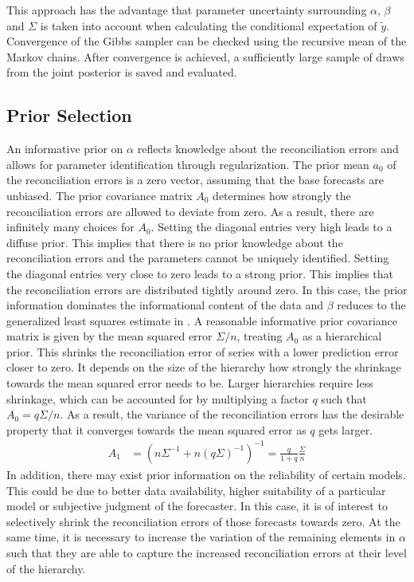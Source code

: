 \documentclass[a4paper,fleqn,11pt]{article}
\begin{document}
\noindent This approach has the advantage that parameter uncertainty surrounding $\alpha$, $\beta$ and $\Sigma$ is taken into account when calculating the conditional expectation of $\tilde y$. Convergence of the Gibbs sampler can be checked using the recursive mean of the Markov chains. After convergence is achieved, a sufficiently large sample of draws from the joint posterior is saved and evaluated.\\

\subsection{Prior Selection}
\label{subsec:prior}
An informative prior on $\alpha$ reflects knowledge about the reconciliation errors and allows for parameter identification through regularization. The prior mean $a_0$ of the reconciliation errors is a zero vector, assuming that the base forecasts are unbiased. The prior covariance matrix $A_0$ determines how strongly the reconciliation errors are allowed to deviate from zero. As a result, there are infinitely many choices for $A_0$. Setting the diagonal entries very high leads to a diffuse prior. This implies that there is no prior knowledge about the reconciliation errors and the parameters cannot be uniquely identified. Setting the diagonal entries very close to zero leads to a strong prior. This implies that the reconciliation errors are distributed tightly around zero. In this case, the prior information dominates the informational content of the data and $\beta$ reduces to the generalized least squares estimate in \cite{Hyndman2016}. A reasonable informative prior covariance matrix is given by the mean squared error $\Sigma/n$, treating $A_0$ as a hierarchical prior. This shrinks the reconciliation error of series with a lower prediction error closer to zero. It depends on the size of the hierarchy how strongly the shrinkage towards the mean squared error needs to be. Larger hierarchies require less shrinkage, which can be accounted for by multiplying a factor $q$ such that $A_0 = q\Sigma/n$. As a result, the variance of the reconciliation errors has the desirable property that it converges towards the mean squared error as $q$ gets larger.
\begin{align*}
A_1 &= \left(n\Sigma^{-1} + n(q\Sigma)^{-1}\right)^{-1} =  \frac{q}{1+q} \frac{\Sigma}{n}
\end{align*}
In addition, there may exist prior information on the reliability of certain models. This could be due to better data availability, higher suitability of a particular model or subjective judgment of the forecaster. In this case, it is of interest to selectively shrink the reconciliation errors of those forecasts towards zero. At the same time, it is necessary to increase the variation of the remaining elements in $\alpha$ such that they are able to capture the increased reconciliation errors at their level of the hierarchy.
\end{document}
